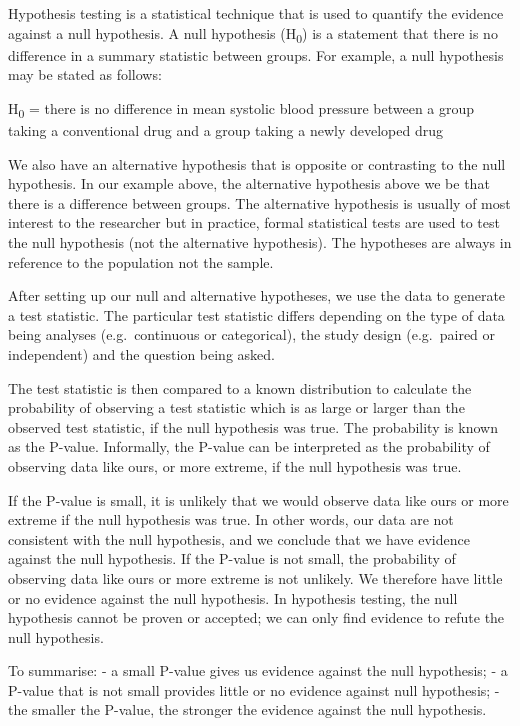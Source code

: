\documentclass[
]{memoir}
\begin{document}
Hypothesis testing is a statistical technique that is used to quantify the evidence against a null hypothesis. A null hypothesis (H\textsubscript{0}) is a statement that there is no difference in a summary statistic between groups. For example, a null hypothesis may be stated as follows:

H\textsubscript{0} = there is no difference in mean systolic blood pressure between a group taking a conventional drug and a group taking a newly developed drug

We also have an alternative hypothesis that is opposite or contrasting to the null hypothesis. In our example above, the alternative hypothesis above we be that there is a difference between groups. The alternative hypothesis is usually of most interest to the researcher but in practice, formal statistical tests are used to test the null hypothesis (not the alternative hypothesis). The hypotheses are always in reference to the population not the sample.

After setting up our null and alternative hypotheses, we use the data to generate a test statistic. The particular test statistic differs depending on the type of data being analyses (e.g.~continuous or categorical), the study design (e.g.~paired or independent) and the question being asked.

The test statistic is then compared to a known distribution to calculate the probability of observing a test statistic which is as large or larger than the observed test statistic, if the null hypothesis was true. The probability is known as the P-value.
Informally, the P-value can be interpreted as the probability of observing data like ours, or more extreme, if the null hypothesis was true.

If the P-value is small, it is unlikely that we would observe data like ours or more extreme if the null hypothesis was true. In other words, our data are not consistent with the null hypothesis, and we conclude that we have evidence against the null hypothesis. If the P-value is not small, the probability of observing data like ours or more extreme is not unlikely. We therefore have little or no evidence against the null hypothesis. In hypothesis testing, the null hypothesis cannot be proven or accepted; we can only find evidence to refute the null hypothesis.

To summarise:
- a small P-value gives us evidence against the null hypothesis;
- a P-value that is not small provides little or no evidence against null hypothesis;
- the smaller the P-value, the stronger the evidence against the null hypothesis.
\end{document}
